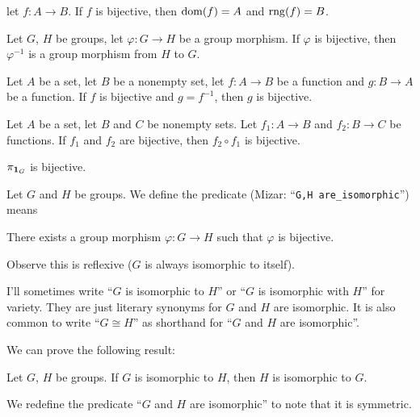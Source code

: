 \documentclass{article}
\begin{document}
\begin{thm}
  let $f\colon A\to B$. If $f$ is bijective, then $\operatorname{dom}(f)=A$ and $\operatorname{rng}(f)=B$.
\item\label{group6:62} Let $G$, $H$ be groups, let $\varphi\colon G\to H$
  be a group morphism. If $\varphi$ is bijective, then $\varphi^{-1}$ is
  a group morphism from $H$ to $G$.
\item\label{group6:63} Let $A$ be a set, let $B$ be a nonempty set, let
  $f\colon A\to B$ be a function and $g\colon B\to A$ be a function.
  If $f$ is bijective and $g=f^{-1}$, then $g$ is bijective.
\item\label{group6:64} Let $A$ be a set, let $B$ and $C$ be nonempty sets.
  Let $f_{1}\colon A\to B$ and $f_{2}\colon B\to C$ be functions.
  If $f_{1}$ and $f_{2}$ are bijective, then $f_{2}\circ f_{1}$ is bijective.
\item\label{group6:65} $\pi_{\mathbf{1}_{G}}$ is bijective.
\end{thm}

\begin{definition}
  Let $G$ and $H$ be groups.
  We define the predicate 
  (Mizar: ``\verb#G,H are_isomorphic#'') means
  \begin{defn}
  \item There exists a group morphism $\varphi\colon G\to H$ such that
    $\varphi$ is bijective.
  \end{defn}
  Observe this is reflexive ($G$ is always isomorphic to itself).
\end{definition}

\begin{remark}
I'll sometimes write ``$G$ is isomorphic to $H$'' or ``$G$ is isomorphic
with $H$'' for variety. They are just literary synonyms for $G$ and $H$
are isomorphic. It is also common to write ``$G\cong H$'' as shorthand
for ``$G$ and $H$ are isomorphic''.
\end{remark}

We can prove the following result:
\begin{thm}
\item\label{group6:66} Let $G$, $H$ be groups. If $G$ is isomorphic to $H$,
  then $H$ is isomorphic to $G$.
\end{thm}

\begin{definition}
We redefine the predicate ``$G$ and $H$ are isomorphic'' to note that it
is symmetric.
\end{definition}
\end{document}
